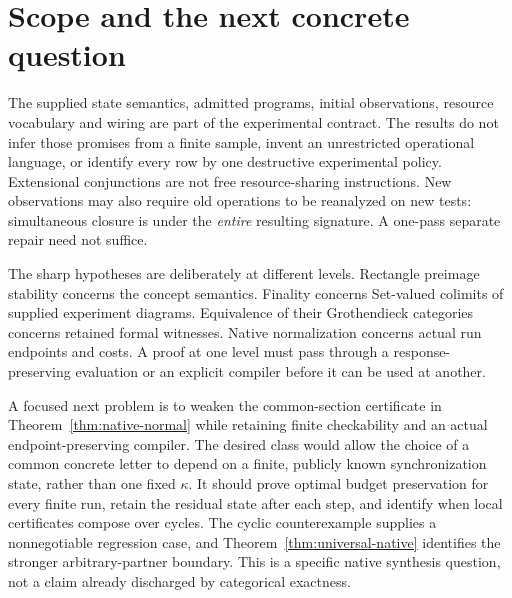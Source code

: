 \documentclass[11pt]{article}
\theoremstyle{definition}\newtheorem{definition}[theorem]{Definition}
\theoremstyle{remark}\newtheorem{remark}[theorem]{Remark}
\begin{document}
\section{Scope and the next concrete question}\label{sec:limits}
The supplied state semantics, admitted programs, initial observations,
resource vocabulary and wiring are part of the experimental contract.
The results do not infer those promises from a finite sample, invent an
unrestricted operational language, or identify every row by one destructive
experimental policy. Extensional conjunctions are not free resource-sharing
instructions. New observations may also require old operations to be
reanalyzed on new tests: simultaneous closure is under the \emph{entire}
resulting signature. A one-pass separate repair need not suffice.

The sharp hypotheses are deliberately at different levels. Rectangle
preimage stability concerns the concept semantics. Finality concerns
Set-valued colimits of supplied experiment diagrams. Equivalence of their
Grothendieck categories concerns retained formal witnesses. Native
normalization concerns actual run endpoints and costs. A proof at one
level must pass through a response-preserving evaluation or an explicit
compiler before it can be used at another.

A focused next problem is to weaken the common-section certificate in
Theorem~\ref{thm:native-normal} while retaining finite checkability and an
actual endpoint-preserving compiler. The desired class would allow the
choice of a common concrete letter to depend on a finite, publicly known
synchronization state, rather than one fixed $\kappa$. It should prove
optimal budget preservation for every finite run, retain the residual
state after each step, and identify when local certificates compose over
cycles. The cyclic counterexample supplies a nonnegotiable regression
case, and Theorem~\ref{thm:universal-native} identifies the stronger
arbitrary-partner boundary. This is a specific native synthesis question,
not a claim already discharged by categorical exactness.
\end{document}
